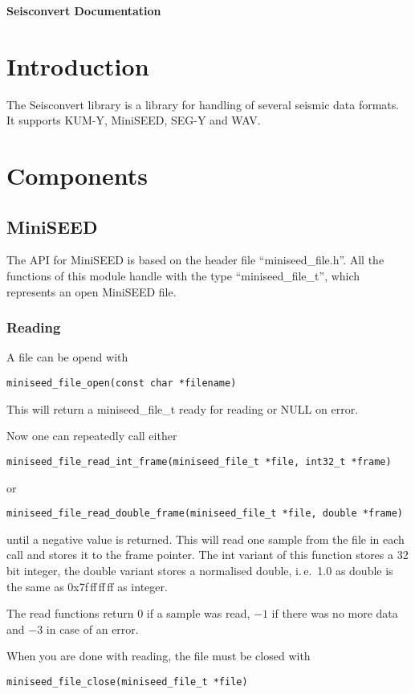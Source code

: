 \documentclass[DIV=10, parskip=half]{scrartcl}
\renewenvironment{quote}
{\list{}{
  \setlength{\rightmargin}{0cm}
  \setlength{\leftmargin}{0.75cm}}%
\item\relax\ignorespaces}
{\unskip\unskip\endlist}
\newcommand{\docline}[1]{%
  \begin{quote}
  \raggedright\texttt{#1}
  \end{quote}
}
\begin{document}
\strut

\vspace{1cm}

\centerline{\huge \textbf{Seisconvert Documentation}}

\vspace{1cm}

\section{Introduction}

The Seisconvert library is a library for handling of several seismic data formats.
It supports KUM-Y, MiniSEED, SEG-Y and WAV.

\section{Components}

\subsection{MiniSEED}

The API for MiniSEED is based on the header file “miniseed\_file.h”.
All the functions of this module handle with the type “miniseed\_file\_t”, which represents an open MiniSEED file.

\subsubsection{Reading}

A file can be opend with
\docline{miniseed\_file\_open(const char *filename)}
This will return a miniseed\_file\_t ready for reading or NULL on error.

Now one can repeatedly call either
\docline{miniseed\_file\_read\_int\_frame(miniseed\_file\_t *file, int32\_t *frame)}
or
\docline{miniseed\_file\_read\_double\_frame(miniseed\_file\_t *file, double *frame)}
until a negative value is returned.
This will read one sample from the file in each call and stores it to the frame pointer.
The int variant of this function stores a 32 bit integer, the double variant stores a normalised double, i.\,e.\ 1.0 as double is the same as 0x7f\,ff\,ff\,ff as integer.

The read functions return \(0\) if a sample was read, \(-1\) if there was no more data and \(-3\) in case of an error.

When you are done with reading, the file must be closed with
\docline{miniseed\_file\_close(miniseed\_file\_t *file)}
\end{document}
